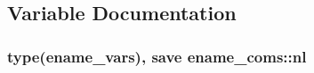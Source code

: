 \subsection{Variable Documentation}
\hypertarget{namespaceename__coms_a87d8817dfc69ff263d0afc7954d7dbc0}{}
\subsubsection[{nl}]{\setlength{\rightskip}{0pt plus 5cm}type({\bf ename\+\_\+vars}), save ename\+\_\+coms\+::nl}\label{namespaceename__coms_a87d8817dfc69ff263d0afc7954d7dbc0}
